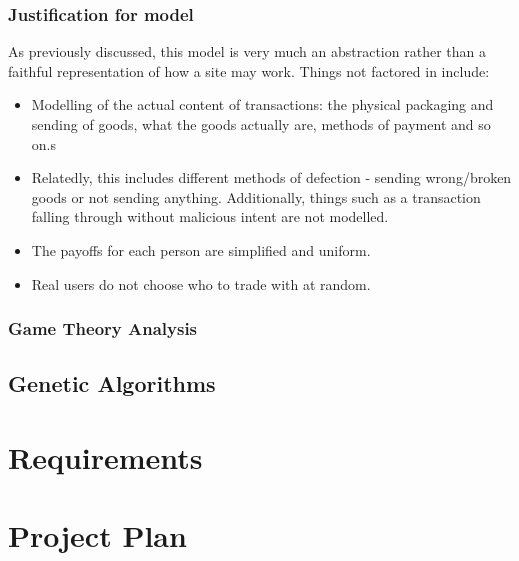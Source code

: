 \documentclass{article}
\begin{document}
\subsubsection{Justification for model}
\label{sec:justification-model}
As previously discussed, this model is very much an abstraction rather than a faithful representation of how a site may work. Things not factored in include:
\begin{itemize}
	\item Modelling of the actual content of transactions: the physical packaging and sending of goods, what the goods actually are, methods of payment and so on.s
	\item Relatedly, this includes different methods of defection - sending wrong/broken goods or not sending anything. Additionally, things such as a transaction falling through without malicious intent are not modelled.
	\item The payoffs for each person are simplified and uniform.
	\item Real users do not choose who to trade with at random.
\end{itemize}

\subsubsection{Game Theory Analysis}
\label{sec:game-theory}

\subsection{Genetic Algorithms}
\label{sec:genetic-algorithms}

\section{Requirements}
\label{sec:requirements}

\section{Project Plan}
\label{sec:project-plan}
\end{document}
